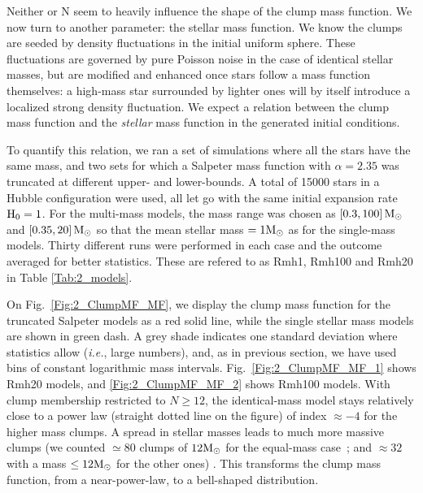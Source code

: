 Neither \tHub or N seem to heavily influence the shape of the clump mass function. We now turn to another parameter: the stellar mass function. We know the clumps are seeded by density fluctuations in the initial uniform sphere. These fluctuations are governed by pure Poisson noise in the case of identical stellar masses, but are modified and enhanced once stars follow a mass function themselves: a high-mass star surrounded by lighter ones will by itself introduce a localized strong density fluctuation. We expect a relation between the clump mass function and  the {\it stellar} mass function in the generated initial conditions.

To quantify this relation, we ran a set of simulations where all the stars have the same mass, and two sets for which a Salpeter mass function with $\alpha = 2.35$  was truncated at different upper- and lower-bounds. A total of 15000 stars in a Hubble configuration were used, all let go  with the same initial expansion rate  ${\textrm{H}}_0 = 1$. For the multi-mass models, the mass range  was chosen as $[0.3, 100]\, {\textrm{M}_\odot}$ and $[0.35, 20]\, {\textrm{M}_\odot}$ so that the mean stellar mass $= 1{\textrm{M}_\odot}$ as for the single-mass models. Thirty different runs were performed in each case and the outcome averaged for better statistics. These are refered to as Rmh1, Rmh100 and Rmh20 in Table \ref{Tab:2_models}.

On Fig.~\ref{Fig:2_ClumpMF_MF}, we display the clump mass function for the truncated Salpeter  models as a red solid line, while the single stellar mass models are shown in green dash. A grey shade indicates one standard deviation where statistics allow ({\it i.e.}, large numbers), and, as in previous section, we have used bins of constant logarithmic mass intervals.  Fig.~\ref{Fig:2_ClumpMF_MF_1} shows Rmh20 models, and \ref{Fig:2_ClumpMF_MF_2} shows Rmh100 models. 
With clump membership restricted to $N \geq 12$, the identical-mass model  stays relatively close to a power law (straight dotted line on the figure) of index $\approx -4$ for the higher mass clumps. A spread in stellar masses leads to much more massive clumps (we counted $\simeq80$ clumps of $12 {\textrm{M}_\odot}$ for the equal-mass case~; and $\approx 32$ with a mass $ \le 12 {\textrm{M}_\odot}$ for the other ones) . This transforms the clump mass function, from a near-power-law, to a bell-shaped distribution.  





